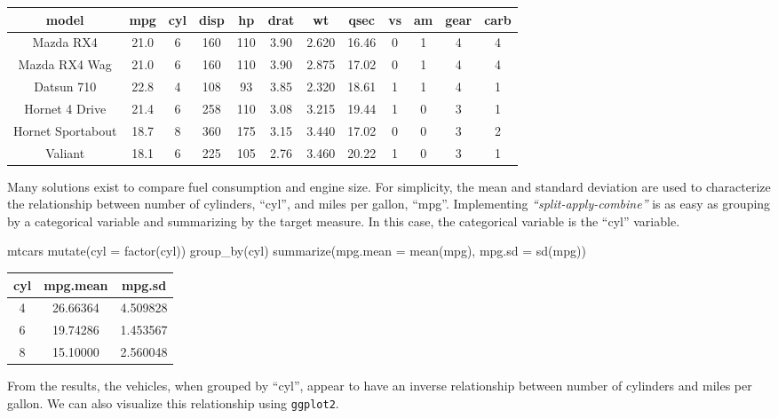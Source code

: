 \begin{tabular}{cccccccccccc}
\toprule
model & mpg & cyl & disp & hp & drat & wt & qsec & vs & am & gear & carb\\
\midrule
Mazda RX4 & 21.0 & 6 & 160 & 110 & 3.90 & 2.620 & 16.46 & 0 & 1 & 4 & 4\\
Mazda RX4 Wag & 21.0 & 6 & 160 & 110 & 3.90 & 2.875 & 17.02 & 0 & 1 & 4 & 4\\
Datsun 710 & 22.8 & 4 & 108 & 93 & 3.85 & 2.320 & 18.61 & 1 & 1 & 4 & 1\\
Hornet 4 Drive & 21.4 & 6 & 258 & 110 & 3.08 & 3.215 & 19.44 & 1 & 0 & 3 & 1\\
Hornet Sportabout & 18.7 & 8 & 360 & 175 & 3.15 & 3.440 & 17.02 & 0 & 0 & 3 & 2\\
Valiant & 18.1 & 6 & 225 & 105 & 2.76 & 3.460 & 20.22 & 1 & 0 & 3 & 1\\
\bottomrule
\end{tabular}

\hspace{20 mm}

Many solutions exist to compare fuel consumption and engine size. For
simplicity, the mean and standard deviation are used to characterize the
relationship between number of cylinders, ``cyl'', and miles per gallon,
``mpg''. Implementing \emph{``split-apply-combine''} is as easy as
grouping by a categorical variable and summarizing by the target
measure. In this case, the categorical variable is the ``cyl'' variable.

\begin{Schunk}
\begin{Sinput}
mtcars %
    mutate(cyl = factor(cyl)) %
    group_by(cyl) %
    summarize(mpg.mean = mean(mpg),
              mpg.sd = sd(mpg))
\end{Sinput}
\end{Schunk}

\begin{tabular}{ccc}
\toprule
cyl & mpg.mean & mpg.sd\\
\midrule
4 & 26.66364 & 4.509828\\
6 & 19.74286 & 1.453567\\
8 & 15.10000 & 2.560048\\
\bottomrule
\end{tabular}

\hspace{20 mm}

From the results, the vehicles, when grouped by ``cyl'', appear to have
an inverse relationship between number of cylinders and miles per
gallon. We can also visualize this relationship using \texttt{ggplot2}.


